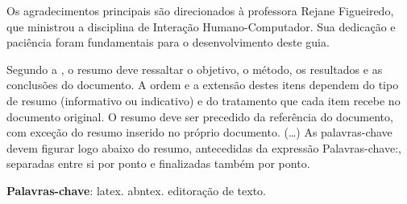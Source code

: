 \documentclass[
  12pt,
  openright,
  twoside,
  a4paper,
  english,
  french,
  spanish,
  brazil
]{abntex2}
\newcommand{\listofquadrosname}{Lista de quadros}
\begin{document}
\frenchspacing

\pretextual
\imprimircapa
\imprimirfolhaderosto*

\begin{agradecimentos}
  Os agradecimentos principais são direcionados à professora Rejane Figueiredo,
  que ministrou a disciplina de Interação Humano-Computador. Sua dedicação e
  paciência foram fundamentais para o desenvolvimento deste guia.
\end{agradecimentos}


\setlength{\absparsep}{18pt} %
\begin{resumo}
 Segundo a , o resumo deve ressaltar o
 objetivo, o método, os resultados e as conclusões do documento. A ordem e a extensão
 destes itens dependem do tipo de resumo (informativo ou indicativo) e do
 tratamento que cada item recebe no documento original. O resumo deve ser
 precedido da referência do documento, com exceção do resumo inserido no
 próprio documento. (\ldots) As palavras-chave devem figurar logo abaixo do
 resumo, antecedidas da expressão Palavras-chave:, separadas entre si por
 ponto e finalizadas também por ponto.

 \textbf{Palavras-chave}: latex. abntex. editoração de texto.
\end{resumo}

\cleardoublepage

\pdfbookmark[0]{\listofquadrosname}{loq}
\listofquadros*
\cleardoublepage

\listoftables*
\cleardoublepage
\end{document}
